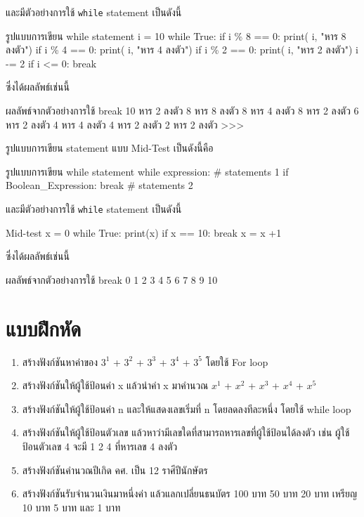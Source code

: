 และมีตัวอย่างการใช้ \texttt{while} statement เป็นดังนี้

\begin{codelist}{รูปแบบการเขียน while statement}{}
i = 10
while True:
    if i \% 8 == 0: print( i, "หาร 8 ลงตัว")
    if i \% 4 == 0: print( i, "หาร 4 ลงตัว")
    if i \% 2 == 0: print( i, "หาร 2 ลงตัว")
    i -= 2
    if i <= 0: break
\end{codelist}

ซึ่งได้ผลลัพธ์เช่นนี้
\begin{codelist}{ผลลัพธ์จากตัวอย่างการใช้ break}{}
10 หาร 2 ลงตัว
8 หาร 8 ลงตัว
8 หาร 4 ลงตัว
8 หาร 2 ลงตัว
6 หาร 2 ลงตัว
4 หาร 4 ลงตัว
4 หาร 2 ลงตัว
2 หาร 2 ลงตัว
>>>
\end{codelist}

รูปแบบการเขียน   statement แบบ Mid-Test เป็นดังนี้คือ

\begin{codelist}{รูปแบบการเขียน while statement}{}
while expression:
    # statements 1
    if Boolean_Expression: break
    # statements 2
    
\end{codelist}

และมีตัวอย่างการใช้ \texttt{while} statement เป็นดังนี้

\begin{codelist}{Mid-test}{}
x = 0
while True:
    print(x)
    if x == 10: break
    x = x +1
\end{codelist}

ซึ่งได้ผลลัพธ์เช่นนี้
\begin{codelist}{ผลลัพธ์จากตัวอย่างการใช้ break}{}
0
1
2
3
4
5
6
7
8
9
10
\end{codelist}





\section{แบบฝึกหัด}
\begin{enumerate} 

\item 	สร้างฟังก์ชันหาค่าของ  $3^1$ + $3^2$ + $3^3$ + $3^4$ + $3^5$  โดยใช้ For loop
\item 	สร้างฟังก์ชันให้ผู้ใช้ป้อนค่า x แล้วนำค่า x มาคำนวณ $x^1$ + $x^2$ + $x^3$ + $x^4$ + $x^5$
\item 	สร้างฟังก์ชันให้ผู้ใช้ป้อนค่า n และให้แสดงเลขเริ่มที่ n โดยลดลงทีละหนึ่ง โดยใช้ while loop
\item 	สร้างฟังก์ชันให้ผู้ใช้ป้อนตัวเลข แล้วหาว่ามีเลขใดที่สามารถหารเลขที่ผู้ใช้ป้อนได้ลงตัว เช่น ผู้ใช้ป้อนตัวเลข 4 จะมี 1 2 4 ที่หารเลข 4 ลงตัว
\item 	สร้างฟังก์ชันคำนวณปีเกิด คศ. เป็น 12 ราศีปีนักษัตร
\item 	สร้างฟังก์ชันรับจำนวนเงินมาหนึ่งค่า แล้วแลกเปลี่ยนธนบัตร 100 บาท 50 บาท 20 บาท เหรียญ 10 บาท 5 บาท และ 1 บาท
\end{enumerate}